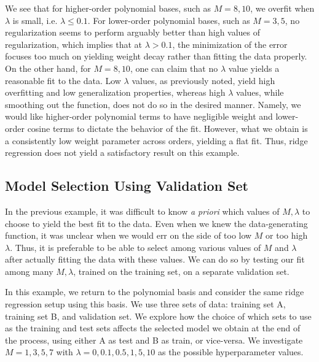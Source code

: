 \documentclass[10pt,psamsfonts]{amsart}
\theoremstyle{definition}
\theoremstyle{remark}
\numberwithin{equation}{section}
\begin{document}
We see that for higher-order polynomial bases, such as $M = 8, 10$, we overfit when $\lambda$ is small, i.e. $\lambda \leq 0.1$. For lower-order polynomial bases, such as $M = 3, 5$, no regularization seems to perform arguably better than high values of regularization, which implies that at $\lambda > 0.1$, the minimization of the error focuses too much on yielding weight decay rather than fitting the data properly. On the other hand, for $M = 8, 10$, one can claim that no $\lambda$ value yields a reasonable fit to the data. Low $\lambda$ values, as previously noted, yield high overfitting and low generalization properties, whereas high $\lambda$ values, while smoothing out the function, does not do so in the desired manner. Namely, we would like higher-order polynomial terms to have negligible weight and lower-order cosine terms to dictate the behavior of the fit. However, what we obtain is a consistently low weight parameter across orders, yielding a flat fit. Thus, ridge regression does not yield a satisfactory result on this example.

\subsection{Model Selection Using Validation Set} In the previous example, it was difficult to know {\em a priori} which values of $M, \lambda$ to choose to yield the best fit to the data. Even when we knew the data-generating function, it was unclear when we would err on the side of too low $M$ or too high $\lambda$. Thus, it is preferable to be able to select among various values of $M$ and $\lambda$ after actually fitting the data with these values. We can do so by testing our fit among many $M, \lambda$, trained on the training set, on a separate validation set.

In this example, we return to the polynomial basis and consider the same ridge regression setup using this basis. We use three sets of data: training set A, training set B, and validation set. We explore how the choice of which sets to use as the training and test sets affects the selected model we obtain at the end of the process, using either A as test and B as train, or vice-versa. We investigate $M = 1, 3, 5, 7$ with $\lambda = 0, 0.1, 0.5, 1, 5, 10$ as the possible hyperparameter values.
\end{document}
